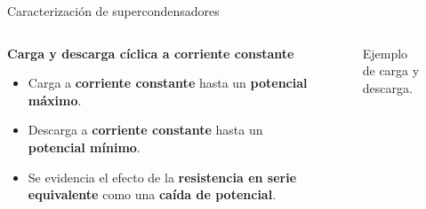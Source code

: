 \documentclass[aspectratio=169]{beamer}
\begin{document}
	\begin{frame}[fragile]{Caracterización de supercondensadores}
		\begin{columns}
			\begin{column}{0.5\textwidth}
				\only<1-> \textbf{Carga y descarga cíclica a corriente constante}
				\begin{itemize}[<+(1)->]
					\item Carga a \textbf{corriente constante} hasta un \textbf{potencial máximo}.
					\item Descarga a \textbf{corriente constante} hasta un \textbf{potencial mínimo}.
					\item Se evidencia el efecto de la\textbf{ resistencia en serie equivalente} como una \textbf{caída de potencial}.
				\end{itemize}
			\end{column}
			\begin{column}{0.5\textwidth}
				\begin{figure}
					\caption{Ejemplo de carga y descarga.}
				\end{figure}			
			\end{column}
		\end{columns}
	\end{frame}
	

	\newcommand{\clipradius}{1.7cm}
\end{document}
